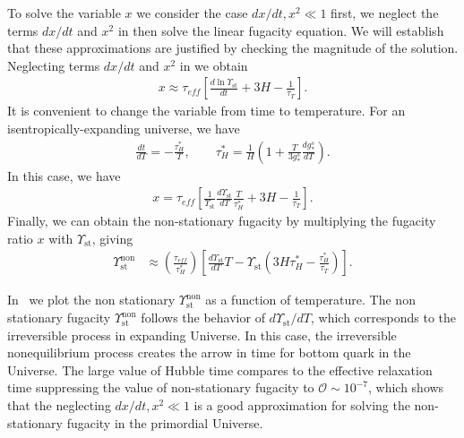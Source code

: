 To solve the variable $x$ we consider the case $dx/dt,x^2\ll1$ first, we neglect the terms $dx/dt$ and $x^2$ in  then solve the linear fugacity equation. We will establish that these approximations are justified by checking the magnitude of the solution. Neglecting terms $dx/dt$ and $x^2$ in  we obtain
\begin{align}
x\approx\tau_{eff}\left[\frac{d\ln\Upsilon_\mathrm{st}}{dt}+3H-\frac{1}{\tau_T}\right].
\end{align}
It is convenient to change the variable from time to temperature. For an isentropically-expanding universe, we have
\begin{align}\label{tau_H}
\frac{dt}{dT}=-\frac{\tau^\ast_H}{T},\qquad \tau^\ast_H=\frac{1}{H}\left(1+\frac{T}{3g^s_\ast}\frac{dg^s_\ast}{dT}\right).
\end{align}
In this case, we have
\begin{align}
x=\tau_{eff}\left[\frac{1}{\Upsilon_\mathrm{st}}\frac{d\Upsilon_\mathrm{st}}{dT}\frac{T}{\tau^\ast_H}+3H-\frac{1}{\tau_T}\right].
\end{align}
Finally, we can obtain the non-stationary fugacity by multiplying the fugacity ratio $x$ with $\Upsilon_\mathrm{st}$, giving 
\begin{align}
\Upsilon_{\mathrm{st}}^{\mathrm{non}}
&\approx\left(\frac{\tau_{eff}}{\tau^\ast_H}\right)\left[\frac{d\Upsilon_\mathrm{st}}{dT}T-\Upsilon_{\mathrm{st}}\left(3H\tau^\ast_H-\frac{\tau^\ast_H}{\tau_T}\right)\right].
\end{align}

In~ we plot the non stationary $\Upsilon^{\mathrm{non}}_\mathrm{st}$ as a function of temperature. The non stationary fugacity $\Upsilon^{\mathrm{non}}_\mathrm{st}$ follows the behavior of $d\Upsilon_{\mathrm{st}}/dT$, which corresponds to the irreversible process in expanding Universe. In this case, the irreversible nonequilibrium process creates the arrow in time for bottom quark in the Universe. The large value of Hubble time compares to the effective relaxation time suppressing the value of non-stationary fugacity to $\mathcal{O}\sim10^{-7}$, which shows that the neglecting $dx/dt,x^2\ll1$ is a good approximation for solving the non-stationary fugacity in the primordial Universe.


